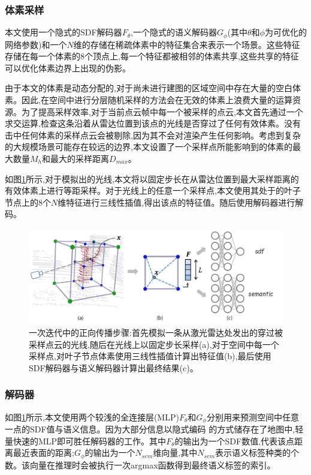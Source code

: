 \subsubsection{体素采样}
本文使用一个隐式的SDF解码器$F_\theta$,一个隐式的语义解码器$G_\phi$(其中$\theta$和$\phi$为可优化的网络参数)和一个$N$维的存储在稀疏体素中的特征集合来表示一个场景。这些特征存储在每一个体素的8个顶点上,每一个特征都被相邻的体素共享,这些共享的特征可以优化体素边界上出现的伪影。

由于本文的体素是动态分配的,对于尚未进行建图的区域空间中存在大量的空白体素。因此,在空间中进行分层随机采样的方法会在无效的体素上浪费大量的运算资源。为了提高采样效率,对于当前点云帧中每一个被采样的点云,本文首先通过一个求交运算,检查这条沿着从雷达位置到该点的光线是否穿过了任何有效体素。没有击中任何体素的采样点云会被剔除,因为其不会对渲染产生任何影响。考虑到复杂的大规模场景可能存在较远的边界,本文设置了一个采样点所能影响到的体素的最大数量$M_h$和最大的采样距离$D_{max}$。

如图\ref{shinemapping}所示,对于模拟出的光线,本文将以固定步长在从雷达位置到最大采样距离的有效体素上进行等距采样。对于光线上的任意一个采样点,本文使用其处于的叶子节点上的8个$N$维特征进行三线性插值,得出该点的特征值。随后使用解码器进行解码。
\begin{figure}[htbp]
    \includegraphics[scale = 0.3]{figures/shinemapping.png}
    \centering
    \caption{一次迭代中的正向传播步骤:首先模拟一条从激光雷达处发出的穿过被采样点云的光线,随后在光线上以固定步长采样(a),对于空间中每一个采样点,对叶子节点体素使用三线性插值计算出特征值(b),最后使用SDF解码器与语义解码器计算出最终结果(c)。}\label{shinemapping}
\end{figure}
\subsubsection{解码器}
如图\ref{shinemapping}所示,本文使用两个较浅的全连接层(MLP)$F_\theta$和$G_\phi$分别用来预测空间中任意一点的SDF值与语义信息。因为大部分信息以隐式编码
的方式储存在了地图中,轻量快速的MLP即可胜任解码器的工作。其中$F_\theta$的输出为一个SDF数值,代表该点距离最近表面的距离;$G_\phi$的输出为一个$N_{sem}$维向量,其中$N_{sem}$表示语义标签种类的个数。该向量在推理时会被执行一次argmax函数得到最终语义标签的索引。
